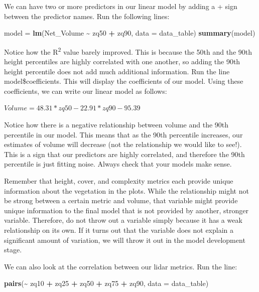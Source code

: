 \documentclass[
]{book}
\newenvironment{Shaded}{\begin{snugshade}}{\end{snugshade}}
\newcommand{\AttributeTok}[1]{\textcolor[rgb]{0.13,0.29,0.53}{#1}}
\newcommand{\FunctionTok}[1]{\textcolor[rgb]{0.13,0.29,0.53}{\textbf{#1}}}
\newcommand{\NormalTok}[1]{#1}
\newcommand{\OtherTok}[1]{\textcolor[rgb]{0.56,0.35,0.01}{#1}}
\newcommand{\SpecialCharTok}[1]{\textcolor[rgb]{0.81,0.36,0.00}{\textbf{#1}}}
\begin{document}
We can have two or more predictors in our linear model by adding a + sign between the predictor names. Run the following lines:

\begin{Shaded}
\begin{Highlighting}[]
\NormalTok{model }\OtherTok{=} \FunctionTok{lm}\NormalTok{(Net\_Volume }\SpecialCharTok{\textasciitilde{}}\NormalTok{ zq50 }\SpecialCharTok{+}\NormalTok{ zq90, }\AttributeTok{data =}\NormalTok{ data\_table)}
\FunctionTok{summary}\NormalTok{(model)}
\end{Highlighting}
\end{Shaded}

Notice how the R\textsuperscript{2} value barely improved. This is because the 50th and the 90th height percentiles are highly correlated with one another, so adding the 90th height percentile does not add much additional information. Run the line model\$coefficients. This will display the coefficients of our model. Using these coefficients, we can write our linear model as follows:

\({Volume = 48.31 * zq50 - 22.91 * zq90 - 95.39}\)

Notice how there is a negative relationship between volume and the 90th percentile in our model. This means that as the 90th percentile increases, our estimates of volume will decrease (not the relationship we would like to see!). This is a sign that our predictors are highly correlated, and therefore the 90th percentile is just fitting noise. Always check that your models make sense.

Remember that height, cover, and complexity metrics each provide unique information about the vegetation in the plots. While the relationship might not be strong between a certain metric and volume, that variable might provide unique information to the final model that is not provided by another, stronger variable. Therefore, do not throw out a variable simply because it has a weak relationship on its own. If it turns out that the variable does not explain a significant amount of variation, we will throw it out in the model development stage.

We can also look at the correlation between our lidar metrics. Run the line:

\begin{Shaded}
\begin{Highlighting}[]
\FunctionTok{pairs}\NormalTok{(}\SpecialCharTok{\textasciitilde{}}\NormalTok{ zq10 }\SpecialCharTok{+}\NormalTok{ zq25 }\SpecialCharTok{+}\NormalTok{ zq50 }\SpecialCharTok{+}\NormalTok{ zq75 }\SpecialCharTok{+}\NormalTok{ zq90, }\AttributeTok{data =}\NormalTok{ data\_table)}
\end{Highlighting}
\end{Shaded}
\end{document}
